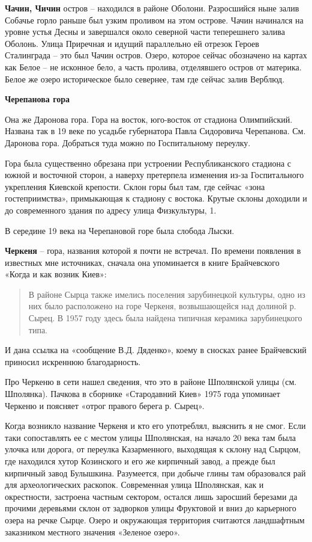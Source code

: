 \medskip

\textbf{Чачин, Чичин} остров – находился в районе Оболони. Разросшийся ныне залив Собачье горло раньше был узким проливом на этом острове. Чачин начинался на уровне устья Десны и завершался около северной части теперешнего залива Оболонь. Улица Приречная и идущий параллельно ей отрезок Героев Сталинграда – это был Чачин остров. Озеро, которое сейчас обозначено на картах как Белое – не исконное бело, а часть пролива, отделявшего остров от материка. Белое же озеро историческое было севернее, там где сейчас залив Верблюд.\\

\medskip

\textbf{Черепанова гора}

Она же Даронова гора. Гора на восток, юго-восток от стадиона Олимпийский. Названа так в 19 веке по усадьбе губернатора Павла Сидоровича Черепанова. См. Даронова гора. Добраться туда можно по Госпитальному переулку.

Гора была существенно обрезана при устроении Республиканского стадиона с южной и восточной сторон, а наверху претерпела изменения из-за Госпитального укрепления Киевской крепости. Склон горы был там, где сейчас «зона гостеприимства», примыкающая к стадиону с востока. Крутые склоны доходили и до современного здания по адресу улица Физкультуры, 1.

В середине 19 века на Черепановой горе была слобода Лыски.\\

\medskip

\textbf{Черкеня} – гора, названия которой я почти не встречал. По времени появления в известных мне источниках, сначала она упоминается в книге Брайчевского «Когда и как возник Киев»:

\begin{quotation}
В районе Сырца также имелись поселения зарубинецкой культуры, одно из них было расположено на горе Черкеня, возвышающейся над долиной р. Сырец. В 1957 году здесь была найдена типичная керамика зарубинецкого типа.
\end{quotation}

И дана ссылка на «сообщение В.Д. Дяденко», коему в сносках ранее Брайчевский приносил искреннюю благодарность.

Про Черкеню в сети нашел сведения, что это в районе Шполянской улицы (см. Шполянка). Пачкова в сборнике «Стародавний Киев» 1975 года упоминает Черкеню и поясняет «отрог правого берега р. Сырец».

Когда возникло название Черкеня и кто его употреблял, выяснить я не смог. Если таки сопоставлять ее с местом улицы Шполянская, на начало 20 века там была улочка или дорога, от переулка Казарменного, выходящая к склону над Сырцом, где находился хутор Козинского и его же кирпичный завод, а прежде был кирпичный завод Булышкина. Разумеется, при добыче глины там образовался рай для археологических раскопок. Современная улица Шполянская, как и окрестности, застроена частным сектором, остался лишь заросший березами да прочими деревьями склон от задворков улицы Фруктовой и вниз до карьерного озера на речке Сырце. Озеро и окружающая территория считаются ландшафтным заказником местного значения «Зеленое озеро».

